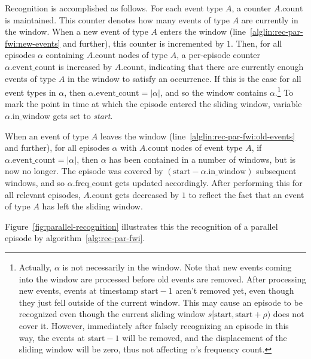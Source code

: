 Recognition is accomplished as follows. For each event type $ A $, a counter $ A \text{.count} $ is maintained. This counter denotes how many events of type $ A $ are currently in the window. When a new event of type $ A $ enters the window (line~\ref{alglin:rec-par-fwi:new-events} and further), this counter is incremented by $ 1 $. Then, for all episodes $ \alpha $ containing $ A \text{.count} $ nodes of type $ A $, a per-episode counter $ \alpha \text{.event\_count} $ is increased by $ A \text{.count} $, indicating that there are currently enough events of type $ A $ in the window to satisfy an occurrence. If this is the case for all event types in $ \alpha $, then $ \alpha \text{.event\_count} = | \alpha | $, and so the window contains $ \alpha $.\footnote{\label{footnote:false-recognition}Actually, $ \alpha $ is not necessarily in the window. Note that new events coming into the window are processed before old events are removed. After processing new events, events at timestamp $ \text{start} - 1 $ aren't removed yet, even though they just fell outside of the current window. This may cause an episode to be recognized even though the current sliding window $ s[\text{start}, \text{start} + \rho) $ does not cover it. However, immediately after falsely recognizing an episode in this way, the events at $ \text{start} - 1 $ will be removed, and the displacement of the sliding window will be zero, thus not affecting $ \alpha $'s frequency count.} To mark the point in time at which the episode entered the sliding window, variable $ \alpha \text{.in\_window} $ gets set to \emph{start}.

When an event of type $ A $ leaves the window (line~\ref{alglin:rec-par-fwi:old-events} and further), for all episodes $ \alpha $ with $ A \text{.count} $ nodes of event type $ A $, if $ \alpha \text{.event\_count} = | \alpha | $, then $ \alpha $ has been contained in a number of windows, but is now no longer. The episode was covered by $ (\text{start} - \alpha \text{.in\_window}) $ subsequent windows, and so $ \alpha \text{.freq\_count} $ gets updated accordingly. After performing this for all relevant episodes, $ A \text{.count} $ gets decreased by $ 1 $ to reflect the fact that an event of type $ A $ has left the sliding window.

Figure~\ref{fig:parallel-recognition} illustrates this the recognition of a parallel episode by algorithm~\ref{alg:rec-par-fwi}.

